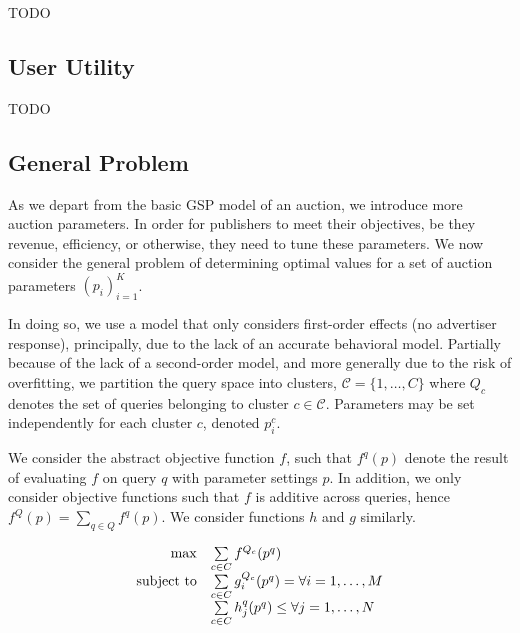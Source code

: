 \documentclass[prodmode,acmtist]{acmsmall} %
\newcommand{\subjectto}{\mathop{\rm {subject\ to}}\nolimits}
\begin{document}
TODO


\subsection{User Utility} %
\label{sub:user_utility}

TODO


\subsection{General Problem} %
\label{sub:general_problem}

As we depart from the basic GSP model of an auction, we introduce more auction parameters.
In order for publishers to meet their objectives, be they revenue, efficiency, or otherwise, they need to tune these parameters.
We now consider the general problem of determining optimal values for a set of auction parameters $(p_i)_{i=1}^K$.

In doing so, we use a model that only considers first-order effects (no advertiser response), principally, due to the lack of an accurate behavioral model.
Partially because of the lack of a second-order model, and more generally due to the risk of overfitting, we partition the query space into clusters, $\mathcal{C} = \{1, \ldots, C\}$ where $Q_c$ denotes the set of queries belonging to cluster $c\in \mathcal{C}$.
Parameters may be set independently for each cluster $c$, denoted $p_i^c$.

We consider the abstract objective function $f$, such that $f^q(p)$ denote the result of evaluating $f$ on query $q$ with parameter settings $p$.
In addition, we only consider objective functions such that $f$ is additive across queries, hence $f^Q(p) = \sum _{q \in Q} f^q(p)$. 
We consider functions $h$ and $g$ similarly.

\begin{equation}
\begin{array}{rl}
\max & \sum\limits_{c \in C} f^{Q_c}(p^q) \\
\subjectto & \sum\limits_{c \in C} g_i^{Q_c}(p^q) = \forall i = 1,\ldots,M \\
                  & \sum\limits_{c \in C} h_j^q(p^q) \le \forall j = 1,\ldots,N\\
\end{array}
\end{equation}
\end{document}
